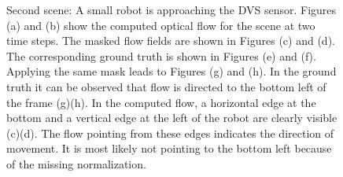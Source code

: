 \begin{appendix}
\begin{figure}[tb]
\begin{subfigure}{.45\textwidth}
  \caption{}
\end{subfigure}
\caption[Second scene: Robot approaching the DVS sensor.]{Second scene: A small robot is approaching the DVS sensor. Figures (a) and (b) show the computed optical flow for the scene at two time steps. The masked flow fields are shown in Figures (c) and (d).
The corresponding ground truth is shown in Figures (e) and (f). Applying the same mask leads to Figures (g) and (h).
In the ground truth it can be observed that flow is directed to the bottom left of the frame (g)(h). 
In the computed flow, a horizontal edge at the bottom and a vertical edge at the left of the robot are clearly visible (c)(d).
The flow pointing from these edges indicates the direction of movement. 
It is most likely not pointing to the bottom left because of the missing normalization.}
\label{fig:app_pushbot-snapshots}
\end{figure}



\end{appendix}
